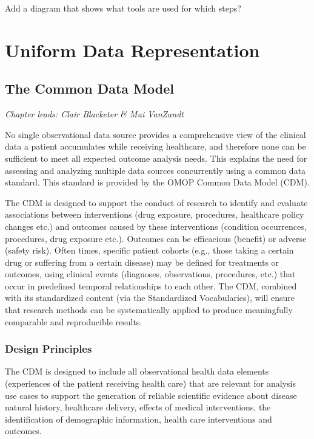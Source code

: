 \documentclass[11pt]{book}
\begin{document}
Add a diagram that shows what tools are used for which steps?

\part{Uniform Data
Representation}\label{part-uniform-data-representation}

\chapter{The Common Data Model}\label{CommonDataModel}

\emph{Chapter leads: Clair Blacketer \& Mui VanZandt}

No single observational data source provides a comprehensive view of the
clinical data a patient accumulates while receiving healthcare, and
therefore none can be sufficient to meet all expected outcome analysis
needs. This explains the need for assessing and analyzing multiple data
sources concurrently using a common data standard. This standard is
provided by the OMOP Common Data Model (CDM).

The CDM is designed to support the conduct of research to identify and
evaluate associations between interventions (drug exposure, procedures,
healthcare policy changes etc.) and outcomes caused by these
interventions (condition occurrences, procedures, drug exposure etc.).
Outcomes can be efficacious (benefit) or adverse (safety risk). Often
times, specific patient cohorts (e.g., those taking a certain drug or
suffering from a certain disease) may be defined for treatments or
outcomes, using clinical events (diagnoses, observations, procedures,
etc.) that occur in predefined temporal relationships to each other. The
CDM, combined with its standardized content (via the Standardized
Vocabularies), will ensure that research methods can be systematically
applied to produce meaningfully comparable and reproducible results.

\section{Design Principles}\label{design-principles}

The CDM is designed to include all observational health data elements
(experiences of the patient receiving health care) that are relevant for
analysis use cases to support the generation of reliable scientific
evidence about disease natural history, healthcare delivery, effects of
medical interventions, the identification of demographic information,
health care interventions and outcomes.
\end{document}
